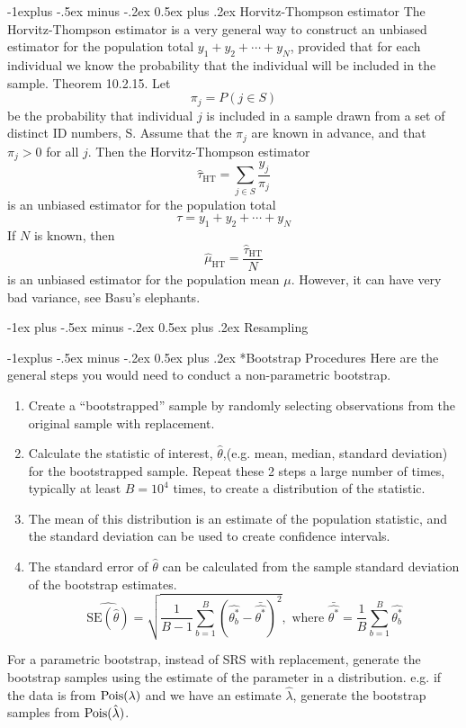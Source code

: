 \documentclass[10pt,landscape]{article}
\makeatletter
\renewcommand{\section}{\@startsection{section}{1}{0mm}%
                                {-1ex plus -.5ex minus -.2ex}%
                                {0.5ex plus .2ex}%
                                {\normalfont\large\bfseries}}
\renewcommand{\subsection}{\@startsection{subsection}{2}{0mm}%
                                {-1explus -.5ex minus -.2ex}%
                                {0.5ex plus .2ex}%
                                {\normalfont\normalsize\bfseries}}
\makeatother
\begin{document}
\begin{multicols*}{3}
\subsection{Horvitz-Thompson estimator}
The Horvitz-Thompson estimator is a very general way to construct an unbiased estimator for the population total $y_1+y_2+\cdots+y_N$, provided that for each individual we know the probability that the individual will be included in the sample.
Theorem 10.2.15. Let
$$
\pi_j=P(j \in S)
$$
be the probability that individual $j$ is included in a sample drawn from a set of distinct ID numbers, S. Assume that the $\pi_j$ are known in advance, and that $\pi_j>0$ for all $j$. Then the Horvitz-Thompson estimator
$$
\hat{\tau}_{\mathrm{HT}}=\sum_{j \in S} \frac{y_j}{\pi_j}
$$
is an unbiased estimator for the population total
$$
\tau=y_1+y_2+\cdots+y_N
$$
If $N$ is known, then
$$
\hat{\mu}_{\mathrm{HT}}=\frac{\hat{\tau}_{\mathrm{HT}}}{N}
$$
is an unbiased estimator for the population mean $\mu$. However, it can have very bad variance, see Basu's elephants.

\section{Resampling}

\subsection*{Bootstrap Procedures}
Here are the general steps you would need to conduct a non-parametric bootstrap.

\begin{enumerate}
    \item Create a ``bootstrapped'' sample by randomly selecting observations from the original sample with replacement. 
    \item Calculate the statistic of interest, $\hat{\theta}$,(e.g. mean, median, standard deviation) for the bootstrapped sample. Repeat these 2 steps a large number of times, typically at least $B=10^4$ times, to create a distribution of the statistic.
    \item The mean of this distribution is an estimate of the population statistic, and the standard deviation can be used to create confidence intervals.
    \item The standard error of $\hat{\theta}$ can be calculated from the sample standard deviation of the bootstrap estimates.
    $$\widehat{\text{SE}(\hat \theta)} =\sqrt{\frac{1}{B-1} \sum_{b=1}^{B}(\hat{\theta_b^*} - \bar{\hat{\theta^*}})^2}, \text{ where } \bar{\hat{\theta^*}} = \frac{1}{B} \sum_{b=1}^{B} \hat{\theta_b^*}$$
\end{enumerate}
For a parametric bootstrap, instead of SRS with replacement, generate the bootstrap samples using the estimate of the parameter in a distribution. e.g. if the data is from $\operatorname{Pois}(\lambda)$ and we have an estimate $\hat\lambda$, generate the bootstrap samples from $\operatorname{Pois}(\hat\lambda)$.


\end{multicols*}
\end{document}

